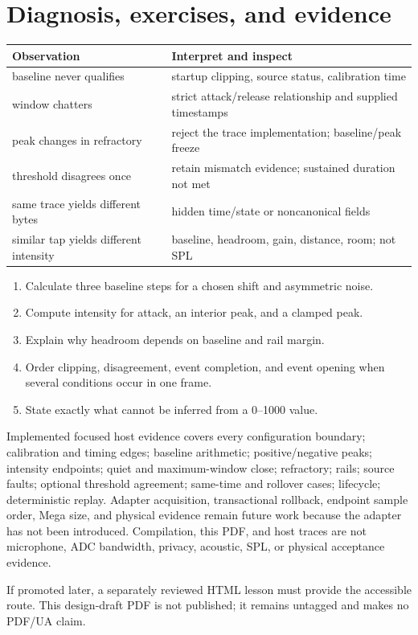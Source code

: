 \documentclass[11pt]{article}
\begin{document}
\section{Diagnosis, exercises, and evidence}
\begin{tabularx}{\linewidth}{@{}X X@{}}
\toprule
Observation & Interpret and inspect\\
\midrule
baseline never qualifies & startup clipping, source status, calibration time\\
window chatters & strict attack/release relationship and supplied timestamps\\
peak changes in refractory & reject the trace implementation; baseline/peak freeze\\
threshold disagrees once & retain mismatch evidence; sustained duration not met\\
same trace yields different bytes & hidden time/state or noncanonical fields\\
similar tap yields different intensity & baseline, headroom, gain, distance, room; not SPL\\
\bottomrule
\end{tabularx}
\begin{enumerate}
 \item Calculate three baseline steps for a chosen shift and asymmetric noise.
 \item Compute intensity for attack, an interior peak, and a clamped peak.
 \item Explain why headroom depends on baseline and rail margin.
 \item Order clipping, disagreement, event completion, and event opening when
       several conditions occur in one frame.
 \item State exactly what cannot be inferred from a 0--1000 value.
\end{enumerate}

Implemented focused host evidence covers every configuration boundary;
calibration and timing
edges; baseline arithmetic; positive/negative peaks; intensity endpoints;
quiet and maximum-window close; refractory; rails; source faults; optional
threshold agreement; same-time and rollover cases; lifecycle; deterministic
replay. Adapter acquisition, transactional rollback, endpoint sample order,
Mega size, and physical evidence remain future work because the adapter has
not been introduced.
Compilation, this PDF, and host traces are not microphone, ADC bandwidth,
privacy, acoustic, SPL, or physical acceptance evidence.

If promoted later, a separately reviewed HTML lesson must provide the
accessible route. This design-draft PDF is not published; it remains untagged
and makes no PDF/UA claim.
\end{document}
